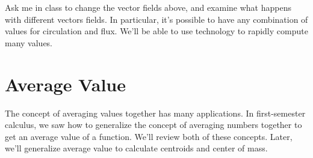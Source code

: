 Ask me in class to change the vector fields above, and examine what happens with different vectors fields.  In particular, it's possible to have any combination of values for circulation and flux. We'll be able to use technology to rapidly compute many values. 





\section{Average Value}

The concept of averaging values together has many applications.  In first-semester calculus, we saw how to generalize the concept of averaging numbers together to get an average value of a function.  We'll review both of these concepts. Later, we'll generalize average value to calculate centroids and center of mass.

